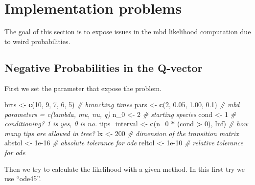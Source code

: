 \documentclass[]{article}
\newenvironment{Shaded}{\begin{snugshade}}{\end{snugshade}}
\newcommand{\CommentTok}[1]{\textcolor[rgb]{0.56,0.35,0.01}{\textit{#1}}}
\newcommand{\DecValTok}[1]{\textcolor[rgb]{0.00,0.00,0.81}{#1}}
\newcommand{\FloatTok}[1]{\textcolor[rgb]{0.00,0.00,0.81}{#1}}
\newcommand{\KeywordTok}[1]{\textcolor[rgb]{0.13,0.29,0.53}{\textbf{#1}}}
\newcommand{\NormalTok}[1]{#1}
\newcommand{\OperatorTok}[1]{\textcolor[rgb]{0.81,0.36,0.00}{\textbf{#1}}}
\newcommand{\OtherTok}[1]{\textcolor[rgb]{0.56,0.35,0.01}{#1}}
\newcommand{\StringTok}[1]{\textcolor[rgb]{0.31,0.60,0.02}{#1}}
\begin{document}
\hypertarget{implementation-problems}{%
\section{Implementation problems}\label{implementation-problems}}

The goal of this section is to expose issues in the mbd likelihood computation
due to weird probabilities.

\hypertarget{negative-probabilities-in-the-q-vector}{%
\subsection{Negative Probabilities in the Q-vector}\label{negative-probabilities-in-the-q-vector}}

First we set the parameter that expose the problem.

\begin{Shaded}
\begin{Highlighting}[]
\NormalTok{brts <-}\StringTok{ }\KeywordTok{c}\NormalTok{(}\DecValTok{10}\NormalTok{, }\DecValTok{9}\NormalTok{, }\DecValTok{7}\NormalTok{, }\DecValTok{6}\NormalTok{, }\DecValTok{5}\NormalTok{) }\CommentTok{# branching times}
\NormalTok{pars <-}\StringTok{ }\KeywordTok{c}\NormalTok{(}\DecValTok{2}\NormalTok{, }\FloatTok{0.05}\NormalTok{, }\FloatTok{1.00}\NormalTok{, }\FloatTok{0.1}\NormalTok{) }\CommentTok{# mbd parameters = c(lambda, mu, nu, q)}
\NormalTok{n_}\DecValTok{0}\NormalTok{ <-}\StringTok{ }\DecValTok{2} \CommentTok{# starting species}
\NormalTok{cond <-}\StringTok{ }\DecValTok{1} \CommentTok{# conditioning? 1 is yes, 0 is no.}
\NormalTok{tips_interval <-}\StringTok{ }\KeywordTok{c}\NormalTok{(n_}\DecValTok{0} \OperatorTok{*}\StringTok{ }\NormalTok{(cond }\OperatorTok{>}\StringTok{ }\DecValTok{0}\NormalTok{), }\OtherTok{Inf}\NormalTok{) }\CommentTok{# how many tips are allowed in tree?}
\NormalTok{lx <-}\StringTok{ }\DecValTok{200} \CommentTok{# dimension of the transition matrix}
\NormalTok{abstol <-}\StringTok{ }\FloatTok{1e-16} \CommentTok{# absolute tolerance for ode}
\NormalTok{reltol <-}\StringTok{ }\FloatTok{1e-10} \CommentTok{# relative tolerance for ode}
\end{Highlighting}
\end{Shaded}

Then we try to calculate the likelihood with a given  method. In this
first try we use ``ode45''.
\end{document}
